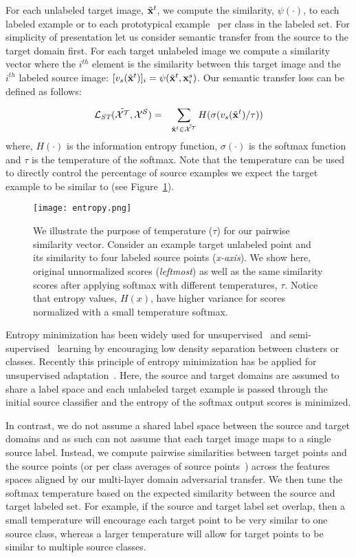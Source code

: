 For each unlabeled target image, $\tilde{\mathbf{x}}^{t}$, we compute the similarity, $\psi(\cdot)$, to each labeled example or to each prototypical example~\cite{snell2017prototypical} per class in the labeled set. For simplicity of presentation let us consider semantic transfer from the source to the target domain first. For each target unlabeled image we compute a similarity vector where the $i^{th}$ element is the similarity between this target image and the $i^{th}$ labeled source image: $[v_s(\tilde{\mathbf{x}}^{t})]_i = \psi(\tilde{\mathbf{x}}^{t}, \mathbf{x}^{s}_i)$. Our semantic transfer loss can be defined as follows:

\begin{eqnarray} \label{eq:5}
\mathcal{L}_{\textit{ST}}(\tilde{\mathcal{X}^{\mathcal{T}}}, \mathcal{X}^{\mathcal{S}}) &=& \sum_{\tilde{\mathbf{x}}^{t}\in\tilde{\mathcal{X}^{\mathcal{T}}}} H(\sigma(v_s(\tilde{\mathbf{x}}^{t})/ \tau))
\end{eqnarray}
where, $H(\cdot)$ is the information entropy function, $\sigma(\cdot)$ is the softmax function and $\tau$ is the temperature of the softmax. Note that the temperature can be used to directly control the percentage of source examples we expect the target example to be similar to (see Figure~\ref{fig:ent_compare}). 

\begin{figure}[t]
\centering
\texttt{[image: entropy.png]}
\caption{We illustrate the purpose of temperature ($\tau$) for our pairwise similarity vector. Consider an example target unlabeled point and its similarity to four labeled source points (\emph{x-axis}). We show here, original unnormalized scores (\emph{leftmost}) as well as the same similarity scores after applying softmax with different temperatures, $\tau$. Notice that entropy values, $H(x)$, have higher variance for scores normalized with a small temperature softmax.}
\label{fig:ent_compare}
\end{figure}

Entropy minimization has been widely used for unsupervised~\cite{aaai99} and semi-supervised~\cite{grandvalet2004semi} learning by encouraging low density separation between clusters or classes.  Recently this principle of entropy minimization has be applied for unsupervised adaptation~\cite{long2016unsupervised}. Here, the source and target domains are assumed to share a label space and each unlabeled target example is passed through the initial source classifier and the entropy of the softmax output scores is minimized.

In contrast, we do not assume a shared label space between the source and target domains and as such can not assume that each target image maps to a single source label. Instead, we compute pairwise similarities between target points and the source points (or per class averages of source points~\cite{snell2017prototypical}) across the features spaces aligned by our multi-layer domain adversarial transfer. We then tune the softmax temperature based on the expected similarity between the source and target labeled set. For example, if the source and target label set overlap, then a small temperature will encourage each target point to be very similar to one source class, whereas a larger temperature will allow for target points to be similar to multiple source classes. 



